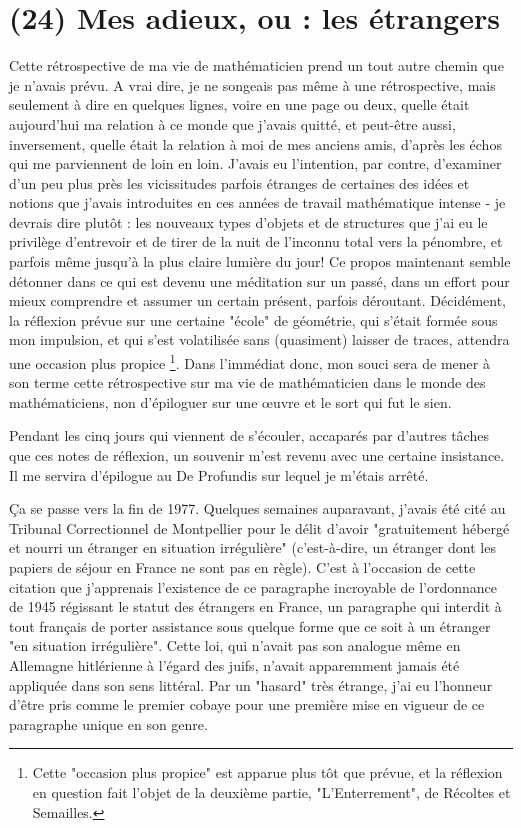 \section{(24) Mes adieux, ou : les étrangers}

Cette rétrospective de ma vie de mathématicien prend un tout autre chemin que je n'avais prévu. A vrai dire, je ne songeais pas même à une rétrospective, mais seulement à dire en quelques lignes, voire en une page ou deux, quelle était aujourd'hui ma relation à ce monde que j'avais quitté, et peut-être aussi, inversement, quelle était la relation à moi de mes anciens amis, d'après les échos qui me parviennent de loin en loin. J'avais eu l'intention, par contre, d'examiner d'un peu plus près les vicissitudes parfois étranges de certaines des idées et notions que j'avais introduites en ces années de travail mathématique intense - je devrais dire plutôt : les nouveaux types d'objets et de structures que j'ai eu le privilège d'entrevoir et de tirer de la nuit de l'inconnu total vers la pénombre, et parfois même jusqu'à la plus claire lumière du jour! Ce propos maintenant semble détonner dans ce qui est devenu une méditation sur un passé, dans un effort pour mieux comprendre et assumer un certain présent, parfois déroutant. Décidément, la réflexion prévue sur une certaine "école" de géométrie, qui s'était formée sous mon impulsion, et qui s'est volatilisée sans (quasiment) laisser de traces, attendra une occasion plus propice \footnote{Cette "occasion plus propice" est apparue plus tôt que prévue, et la réflexion en question fait l'objet de la deuxième partie, "L'Enterrement", de Récoltes et Semailles.}. Dans l'immédiat donc, mon souci sera de mener à son terme cette rétrospective sur ma vie de mathématicien dans le monde des mathématiciens, non d'épiloguer sur une œuvre et le sort qui fut le sien.

Pendant les cinq jours qui viennent de s'écouler, accaparés par d'autres tâches que ces notes de réflexion, un souvenir m'est revenu avec une certaine insistance. Il me servira d'épilogue au De Profundis sur lequel je m'étais arrêté.

Ça se passe vers la fin de 1977. Quelques semaines auparavant, j'avais été cité au Tribunal Correctionnel de Montpellier pour le délit d'avoir "gratuitement hébergé et nourri un étranger en situation irrégulière" (c'est-à-dire, un étranger dont les papiers de séjour en France ne sont pas en règle). C'est à l'occasion de cette citation que j'apprenais l'existence de ce paragraphe incroyable de l'ordonnance de 1945 régissant le statut des étrangers en France, un paragraphe qui interdit à tout français de porter assistance sous quelque forme que ce soit à un étranger "en situation irrégulière". Cette loi, qui n'avait pas son analogue même en Allemagne hitlérienne à l'égard des juifs, n'avait apparemment jamais été appliquée dans son sens littéral. Par un "hasard" très étrange, j'ai eu l'honneur d'être pris comme le premier cobaye pour une première mise en vigueur de ce paragraphe unique en son genre.

